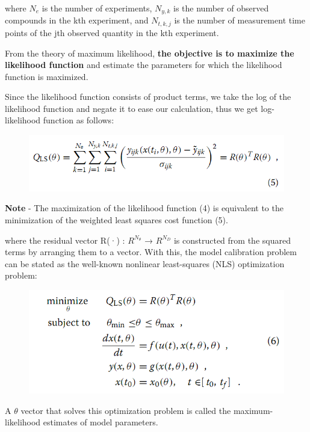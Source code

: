 \documentclass[11pt]{article}
\makeatletter
\def\maxwidth{\ifdim\Gin@nat@width>\linewidth\linewidth
    \else\Gin@nat@width\fi}
\let\Oldincludegraphics\includegraphics
\renewcommand{\includegraphics}[1]{\Oldincludegraphics[width=.8\maxwidth]{#1}}
\makeatother
\begin{document}
where \(N_{e}\) is the number of experiments, \(N_{y,k}\) is the number
of observed compounds in the kth experiment, and \(N_{t,k,j}\) is the
number of measurement time points of the jth observed quantity in the
kth experiment.

From the theory of maximum likelihood, \textbf{the objective is to
maximize the likelihood function} and estimate the parameters for which
the likelihood function is maximized.

Since the likelihood function consists of product terms, we take the log
of the likelihood function and negate it to ease our calculation, thus
we get log-likelihood function as follows:

\begin{figure}[htbp]
\centering
\includegraphics{images/Maximum_log_Likelihood.png}
\caption{}
\end{figure}

\textbf{Note} - The maximization of the likelihood function (4) is
equivalent to the minimization of the weighted least squares cost
function (5).

where the residual vector R(·) : \(R^{N_{θ}}\) → \(R^{N_{D}}\) is
constructed from the squared terms by arranging them to a vector. With
this, the model calibration problem can be stated as the well-known
nonlinear least-squares (NLS) optimization problem:

\begin{figure}[htbp]
\centering
\includegraphics{images/NLS.png}
\caption{}
\end{figure}

A \(\theta\) vector that solves this optimization problem is called the
maximum-likelihood estimates of model parameters.
\end{document}
